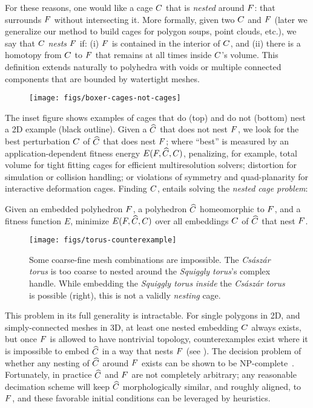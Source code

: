 For these reasons, one would like a cage $C$ that is \emph{nested} around
$F$: that surrounds $F$ without intersecting it. More formally, given
two 
%
$C$ and $F$ (later we generalize our method to build cages for polygon
soups, point clouds, etc.), we say that $C$ \emph{nests} $F$ if: 
%
(i) $F$ is contained in the interior of $C$, and 
%
(ii) there is a homotopy from $C$ to $F$ that remains at all times inside
$C$'s volume. 
This definition extends naturally to polyhedra with voids or multiple connected components that are bounded by watertight meshes.
\clearpage

\begin{wrapfigure}[15]{r}{1.02in}
%
\centering
%
\texttt{[image: figs/boxer-cages-not-cages]}
%
\end{wrapfigure}
%
The inset figure shows examples of cages that do (top) and do not (bottom) nest
a 2D example (black outline). Given a $\widehat{C}$ that does not nest $F$, we
look for the best perturbation $C$ of $\widehat{C}$ that does nest $F$; where
``best'' is measured by an application-dependent fitness energy $E(F,
\widehat{C}, C)$, penalizing, for example, total volume for tight fitting cages
for efficient multiresolution solvers; distortion for simulation or collision
handling; or violations of symmetry and quad-planarity for interactive
deformation cages.  Finding $C$,  entails solving the \emph{nested cage
problem}:

Given an embedded polyhedron $F$, a polyhedron $\widehat{C}$ homeomorphic to $F$, and a
fitness function $E$, minimize $E(F, \widehat{C}, C)$ over all embeddings
$C$ of $\widehat{C}$ that nest $F$.


\begin{figure}
  \texttt{[image: figs/torus-counterexample]}
  \caption{Some coarse-fine mesh combinations are impossible. The
  \emph{Cs\'asz\'ar torus} is too coarse to nested around the
  \emph{Squiggly torus}'s complex handle. While embedding the \emph{Squiggly
  torus} \emph{inside} the \emph{Cs\'asz\'ar torus} is possible (right), this
  is not a validly \emph{nesting} cage.}
  \label{fig:torus-counterexample}
\end{figure}

This problem in its full generality is intractable. For
single polygons in 2D, and simply-connected meshes in 3D, at least one nested
embedding $C$ always exists, but once $F$ is allowed to have nontrivial
topology, counterexamples exist where it is impossible to embed $\widehat{C}$ in a way
that nests $F$ (see ). The decision
problem of whether any nesting of $\widehat{C}$ around $F$ exists can be 
shown to be NP-complete~\cite{CagesNP}.
Fortunately, in practice $\widehat{C}$ and $F$ are not completely arbitrary; any
reasonable decimation scheme will keep $\widehat{C}$ morphologically similar, and
roughly aligned, to $F$, and these favorable initial conditions can be
leveraged by heuristics.

